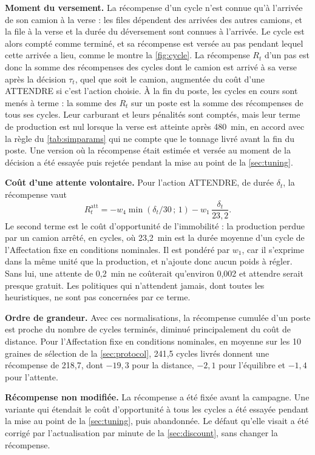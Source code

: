\documentclass[11pt,a4paper]{article}
\newif\ifrevmarks
\newcommand{\revtag}[1]{\ifrevmarks\textsuperscript{\textcolor{red!70!black}{\scriptsize[#1]}}\fi}
\newenvironment{revbloc}[1]{\par\ifrevmarks\color{revcolor}\noindent\revtag{#1}\ \fi}{\par}
\newif\ifcorrmarks
\newcommand{\corr}[1]{\ifcorrmarks\textcolor{corrcolor}{#1}\else#1\fi}
\begin{document}
\begin{revbloc}{M10, M16, v3}
\textbf{Moment du versement.} \corr{La récompense d'un cycle n'est connue qu'à l'arrivée de son camion à la verse : les files dépendent des arrivées des autres camions, et la file à la verse et la durée du déversement sont connues à l'arrivée. Le cycle est alors compté comme terminé, et sa récompense est versée au pas pendant lequel cette arrivée a lieu, comme le montre la \cref{fig:cycle}. La récompense $R_t$ d'un pas est donc la somme des récompenses des cycles dont le camion est arrivé à sa verse après la décision $\tau_t$,} quel que soit le camion, augmentée du coût d'une ATTENDRE si c'est l'action choisie. À la fin du poste, les cycles en cours sont menés à terme : la somme des $R_t$ sur un poste est la somme des récompenses de tous ses cycles. \corr{Leur carburant et leurs pénalités sont comptés, mais leur terme de production est nul lorsque la verse est atteinte après 480~min, en accord avec la règle du \cref{tab:simparams} qui ne compte que le tonnage livré avant la fin du poste.} Une version où la récompense était estimée et versée au moment de la décision a été essayée puis rejetée pendant la mise au point de la \cref{sec:tuning}.

\textbf{Coût d'une attente volontaire.} Pour l'action ATTENDRE, de durée $\delta_t$, la récompense vaut
\begin{equation}
R^{\mathrm{att}}_t = - w_4 \min(\delta_t/30\,;\,1) - w_1\, \frac{\delta_t}{23{,}2} .
\label{eq:wait-reward}
\end{equation}
Le second terme est le coût d'opportunité de l'immobilité : la production perdue par un camion arrêté, en cycles, où 23,2~min est la durée moyenne d'un cycle de l'Affectation fixe en conditions nominales. Il est pondéré par $w_1$, car il s'exprime dans la même unité que la production, et n'ajoute donc aucun poids à régler. Sans lui, une attente de 0,2~min ne coûterait qu'environ 0,002 et attendre serait presque gratuit. Les politiques qui n'attendent jamais, dont toutes les heuristiques, ne sont pas concernées par ce terme.

\textbf{Ordre de grandeur.} Avec ces normalisations, la récompense cumulée d'un poste est proche du nombre de cycles terminés, diminué principalement du coût de distance. Pour l'Affectation fixe en conditions nominales, en moyenne sur les 10 graines de sélection de la \cref{sec:protocol}, 241,5 cycles livrés donnent une récompense de 218,7, dont $-19{,}3$ pour la distance, $-2{,}1$ pour l'équilibre et $-1{,}4$ pour l'attente.

\textbf{Récompense non modifiée.} La récompense a été fixée avant la campagne. Une variante qui étendait le coût d'opportunité à tous les cycles a été essayée pendant la mise au point de la \cref{sec:tuning}, puis abandonnée. Le défaut qu'elle visait a été corrigé par l'actualisation par minute de la \cref{sec:discount}, sans changer la récompense.
\end{revbloc}
\end{document}
